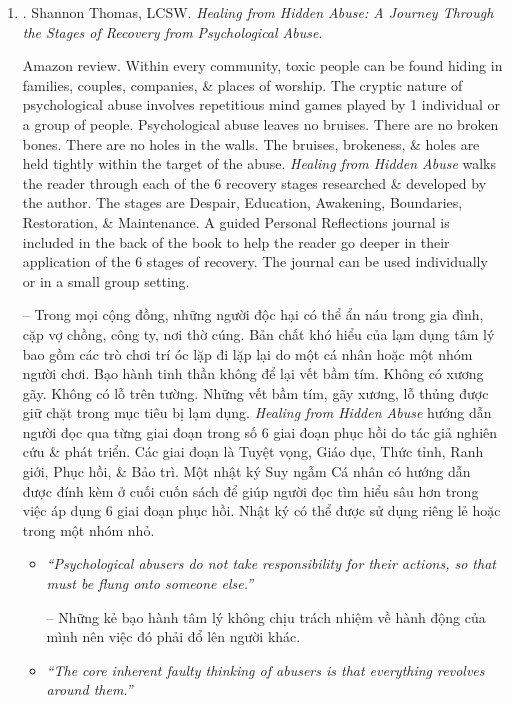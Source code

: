 \documentclass{article}
\begin{document}
\begin{enumerate}
	\item \cite{Thomas_psychological_manipulation}. {\sc Shannon Thomas, LCSW}. {\it Healing from Hidden Abuse: A Journey Through the Stages of Recovery from Psychological Abuse}. {}
	
	{\sf Amazon review.} Within every community, toxic people can be found hiding in families, couples, companies, \& places of worship. The cryptic nature of psychological abuse involves repetitious mind games played by 1 individual or a group of people. Psychological abuse leaves no bruises. There are no broken bones. There are no holes in the walls. The bruises, brokeness, \& holes are held tightly within the target of the abuse. {\it Healing from Hidden Abuse} walks the reader through each of the 6 recovery stages researched \& developed by the author. The stages are Despair, Education, Awakening, Boundaries, Restoration, \& Maintenance. A guided Personal Reflections journal is included in the back of the book to help the reader go deeper in their application of the 6 stages of recovery. The journal can be used individually or in a small group setting.
	
	-- Trong mọi cộng đồng, những người độc hại có thể ẩn náu trong gia đình, cặp vợ chồng, công ty, nơi thờ cúng. Bản chất khó hiểu của lạm dụng tâm lý bao gồm các trò chơi trí óc lặp đi lặp lại do một cá nhân hoặc một nhóm người chơi. Bạo hành tinh thần không để lại vết bầm tím. Không có xương gãy. Không có lỗ trên tường. Những vết bầm tím, gãy xương, lỗ thủng được giữ chặt trong mục tiêu bị lạm dụng. {\it Healing from Hidden Abuse} hướng dẫn người đọc qua từng giai đoạn trong số 6 giai đoạn phục hồi do tác giả nghiên cứu \& phát triển. Các giai đoạn là Tuyệt vọng, Giáo dục, Thức tỉnh, Ranh giới, Phục hồi, \& Bảo trì. Một nhật ký Suy ngẫm Cá nhân có hướng dẫn được đính kèm ở cuối cuốn sách để giúp người đọc tìm hiểu sâu hơn trong việc áp dụng 6 giai đoạn phục hồi. Nhật ký có thể được sử dụng riêng lẻ hoặc trong một nhóm nhỏ.
	\begin{itemize}
		\item {\it``Psychological abusers do not take responsibility for their actions, so that must be flung onto someone else.''}
		
		-- Những kẻ bạo hành tâm lý không chịu trách nhiệm về hành động của mình nên việc đó phải đổ lên người khác.
		
		\item {\it``The core inherent faulty thinking of abusers is that everything revolves around them.''}		
		

\end{itemize}
\end{enumerate}
\end{document}

